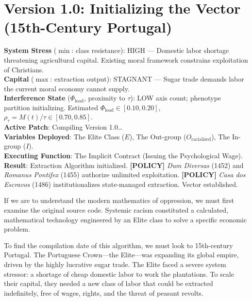 \chapter{Version 1.0: Initializing the Vector (15th-Century Portugal)}
\label{ch:portugal}

\begin{tcolorbox}[colback=black!5, colframe=black!70, fonttitle=\bfseries\ttfamily, title=RUNTIME LOG: 1486 (LISBON{,} PORTUGAL)]
\ttfamily\small
\textbf{System Stress} ($\min$: class resistance): HIGH --- Domestic labor shortage threatening agricultural capital. Existing moral framework constrains exploitation of Christians.\\
\textbf{Capital} ($\max$: extraction output): STAGNANT --- Sugar trade demands labor the current moral economy cannot supply.\\
\textbf{Interference State} ($\Phi_{\text{load}}$, proximity to $\tau$): LOW axis count; phenotype partition initializing. Estimated $\Phi_{\text{load}} \in [0.10, 0.20]$, $\rho_{\tau}=M(t)/\tau \in [0.70, 0.85]$.\\
\textbf{Active Patch}: Compiling Version 1.0\ldots\\
\textbf{Variables Deployed}: The Elite Class ($E$), The Out-group ($O_{\text{racialized}}$), The In-group ($I$).\\
\textbf{Executing Function}: The Implicit Contract (Issuing the Psychological Wage).\\
\textbf{Result}: Extraction Algorithm initialized. \textbf{[POLICY]} \textit{Dum Diversas} (1452) and \textit{Romanus Pontifex} (1455) authorize unlimited exploitation. \textbf{[POLICY]} \textit{Casa dos Escravos} (1486) institutionalizes state-managed extraction. Vector established.
\end{tcolorbox}

\medskip

If we are to understand the modern mathematics of oppression, we must first examine the original source code. Systemic racism constituted a calculated, mathematical technology engineered by an Elite class to solve a specific economic problem.

To find the compilation date of this algorithm, we must look to 15th-century Portugal. The Portuguese Crown---the Elite---was expanding its global empire, driven by the highly lucrative sugar trade. The Elite faced a severe system stressor: a shortage of cheap domestic labor to work the plantations. To scale their capital, they needed a new class of labor that could be extracted indefinitely, free of wages, rights, and the threat of peasant revolts.


